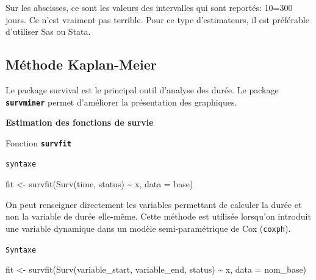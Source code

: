 \documentclass[
  12pt,
  letterpaper,
  DIV=11,
  numbers=noendperiod,
  onepage,
  openany]{scrreprt}
\newenvironment{Shaded}{\begin{snugshade}}{\end{snugshade}}
\newcommand{\AttributeTok}[1]{\textcolor[rgb]{0.80,0.80,0.80}{#1}}
\newcommand{\FunctionTok}[1]{\textcolor[rgb]{0.94,0.94,0.56}{#1}}
\newcommand{\NormalTok}[1]{\textcolor[rgb]{0.80,0.80,0.80}{#1}}
\newcommand{\OtherTok}[1]{\textcolor[rgb]{0.94,0.94,0.56}{#1}}
\newcommand{\SpecialCharTok}[1]{\textcolor[rgb]{0.86,0.64,0.64}{#1}}
\begin{document}
Sur les abscisses, ce sont les valeurs des intervalles qui sont
reportés: 10=300 jours. Ce n'est vraiment pas terrible. Pour ce type
d'estimateurs, il est préférable d'utiliser Sas ou Stata.

\hypertarget{muxe9thode-kaplan-meier}{%
\subsection{Méthode Kaplan-Meier}\label{muxe9thode-kaplan-meier}}

Le package survival est le principal outil d'analyse des durée. Le
package \textbf{\texttt{survminer}} permet d'améliorer la présentation
des graphiques.

\textbf{Estimation des fonctions de survie}

Fonction \textbf{\texttt{survfit}}

\begin{codelisting}

\caption{\texttt{syntaxe}}

\begin{Shaded}
\begin{Highlighting}[]
\NormalTok{fit }\OtherTok{\textless{}{-}} \FunctionTok{survfit}\NormalTok{(}\FunctionTok{Surv}\NormalTok{(time, status) }\SpecialCharTok{\textasciitilde{}}\NormalTok{ x, }\AttributeTok{data =}\NormalTok{ base)}
\end{Highlighting}
\end{Shaded}

\end{codelisting}

On peut renseigner directement les variables permettant de calculer la
durée et non la variable de durée elle-même. Cette méthode est utilisée
lorsqu'on introduit une variable dynamique dans un modèle
semi-paramétrique de Cox (\texttt{coxph}).

\begin{codelisting}

\caption{\texttt{Syntaxe}}

\begin{Shaded}
\begin{Highlighting}[]
\NormalTok{fit }\OtherTok{\textless{}{-}} \FunctionTok{survfit}\NormalTok{(}\FunctionTok{Surv}\NormalTok{(variable\_start, variable\_end, status) }\SpecialCharTok{\textasciitilde{}}\NormalTok{ x, }\AttributeTok{data =}\NormalTok{ nom\_base)}
\end{Highlighting}
\end{Shaded}

\end{codelisting}
\end{document}
